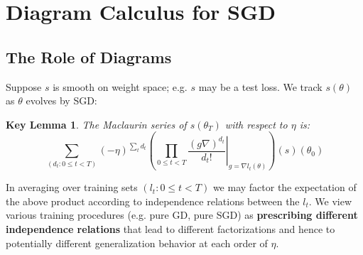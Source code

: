 \documentclass{article}
\newtheorem{klem}{Key Lemma}
\begin{document}

\section{Diagram Calculus for SGD}


    \subsection{The Role of Diagrams}
        Suppose $s$ is smooth on weight space; e.g. $s$ may be a test loss.  We
        track $s(\theta)$ as $\theta$ evolves by SGD:
        \begin{klem}
            The Maclaurin series of $s(\theta_T)$ with respect to $\eta$ is:
            \begin{equation}\label{eq:dyson}
                \sum_{(d_t: 0\leq t<T)}
                (-\eta)^{\sum_t d_t}
                \left(
                    \prod_{0 \leq t < T}
                        \left.  \frac{(g \nabla)^{d_t}}{d_t!} \right|_{g=\nabla l_t(\theta)}
                \right)
                (s) (\theta_0)
            \end{equation}
        \end{klem}
        In averaging over training sets $(l_t: 0\leq t<T)$ we may factor the
        expectation of the above product according to independence relations
        between the $l_t$.  We view various training procedures (e.g. pure GD,
        pure SGD) as {\bf prescribing different independence relations} that
        lead to different factorizations and hence to potentially different
        generalization behavior at each order of $\eta$.
    
\end{document}
